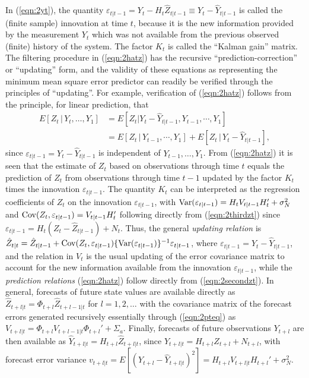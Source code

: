 In (\ref{eqn:2yt}), the quantity $\varepsilon_{t|t-1}= Y_t - H_t \hat{Z}_{t|t-1} \equiv Y_t - \hat{Y}_{t|t-1}$ is called the (finite sample) innovation at time $t$, because it is the new information provided by the measurement $Y_t$ which was not available from the previous observed (finite) history of the system. The factor $K_t$ is called the ``Kalman gain'' matrix. The filtering procedure in (\ref{eqn:2hatz}) has the recursive ``prediction-correction'' or ``updating'' form, and the validity of these equations as representing the minimum mean square error predictor can readily be verified through the principles of ``updating''. For example, verification of (\ref{eqn:2hatz}) follows from the principle, for linear prediction, that
	\[
	\begin{split}
	E[Z_t\,|\,Y_t,\ldots,Y_1]&= E[Z_t|Y_t - \hat{Y}_{t|t-1},Y_{t-1},\cdots,Y_1] \\
	&= E[Z_t\,|\,Y_{t-1},\cdots,Y_1] + E[Z_t \,|\, Y_t - \hat{Y}_{t|t-1}],
	\end{split}
	\]
since $\varepsilon_{t|t-1} = Y_t - \hat{Y}_{t|t-1}$ is independent of $Y_{t-1},\ldots,Y_1$. From (\ref{eqn:2hatz}) it is seen that the estimate of $Z_t$ based on observations through time $t$ equals the prediction of $Z_t$ from observations through time $t-1$ updated by the factor $K_t$ times the innovation $\varepsilon_{t|t-1}$. The quantity $K_t$ can be interpreted as the regression coefficients of $Z_t$ on the innovation $\varepsilon_{t|t-1}$, with $\operatorname{Var}(\varepsilon_{t|t-1}) = H_t V_{t|t-1} H_t' + \sigma_N^2$ and $\operatorname{Cov}(Z_t,\varepsilon_{t|t-1})= V_{t|t-1}H_t'$ following directly from (\ref{eqn:2thirdzt}) since $\varepsilon_{t|t-1} = H_t (Z_t - \hat{Z}_{t|t-1}) + N_t$. Thus, the general \textit{updating relation} is $\hat{Z}_{t|t} = \hat{Z}_{t|t-1} + \operatorname{Cov}(Z_t,\varepsilon_{t|t-1})\{\operatorname{Var}(\varepsilon_{t|t-1})\}^{-1}\varepsilon_{t|t-1}$, where $\varepsilon_{t|t-1} = Y_t - \hat{Y}_{t|t-1}$, and the relation in $V_t$ is the usual updating of the error covariance matrix to account for the new information available from the innovation $\varepsilon_{t|t-1}$, while the \textit{prediction relations} (\ref{eqn:2hatz}) follow directly from (\ref{eqn:2secondzt}). In general, forecasts of future state values are available directly as $\hat{Z}_{t+l|t} = \Phi_{t+l} \hat{Z}_{t+l-1|t}$ for $l = 1,2,\ldots$ with the covariance matrix of the forecast errors generated recursively essentially through (\ref{eqn:2pteq}) as $V_{t+l|t} = \Phi_{t+l}V_{t+l-1|t} \Phi_{t+l}' + \Sigma_a$. Finally, forecasts of future observations $Y_{t+l}$ are then available as $\hat{Y}_{t+l|t} = H_{t+l} \hat{Z}_{t+l|t}$, since $Y_{t+l|t} = H_{t+l} Z_{t+l} + N_{t+l}$, with forecast error variance $v_{t+l|t} = E[(Y_{t+l} - \hat{Y}_{t+l|t})^2] = H_{t+l}V_{t+l|t}H_{t+l}' + \sigma_N^2$.


